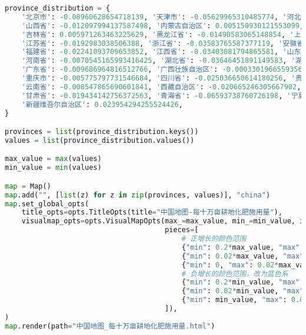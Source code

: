 \begin{lstlisting}[language=python,caption={基础设施}]
province_distribution = {
    '北京市': -0.08960628654718139, '天津市': -0.05629965310485774, '河北省': -0.01812032791303242, 
    '山西省': -0.012097994137587498, '内蒙古自治区': 0.005150930121553099, '辽宁省': -0.012146153771878663, 
    '吉林省': 0.005971263463225629, '黑龙江省': -0.01490583065148854, '上海市': -0.05301926866498563, 
    '江苏省': -0.0192983038506388, '浙江省': -0.03583765587377119, '安徽省': -0.017480241278073683, 
    '福建省': -0.02241093709653852, '江西省': -0.03403081794865581, '山东省': -0.0266357242406009, 
    '河南省': -0.0070545165993416425, '湖北省': -0.03646451891149583, '湖南省': -0.015563959623519754, 
    '广东省': -0.009686964816512766, '广西壮族自治区': -0.00033019665593569947, '海南省': -0.007382193005619597, 
    '重庆市': -0.005775797731546684, '四川省': -0.025036650614180256, '贵州省': -0.02562098695734893, 
    '云南省': -0.008547865690601841, '西藏自治区': -0.020665246305667902, '陕西省': -0.0201640935040992, 
    '甘肃省': -0.019434142756372563, '青海省': -0.06593738760726198, '宁夏回族自治区': -0.008545082053690091, 
    '新疆维吾尔自治区': 0.023954294255524426,
}

provinces = list(province_distribution.keys())
values = list(province_distribution.values())

max_value = max(values)
min_value = min(values)

map = Map()
map.add("", [list(z) for z in zip(provinces, values)], "china")
map.set_global_opts(
    title_opts=opts.TitleOpts(title="中国地图-每十万亩耕地化肥施用量"),
    visualmap_opts=opts.VisualMapOpts(max_=max_value, min_=min_value, is_piecewise=True,
                                      pieces=[
                                          # 正增长的颜色范围
                                          {"min": 0.2*max_value, "max": max_value, "label": "高正增长", "color": "#8B0000"},
                                          {"min": 0.02*max_value, "max": 0.2*max_value, "label": "中正增长", "color": "#FF6347"},
                                          {"min": 0, "max": 0.02*max_value, "label": "低正增长", "color": "#FFA07A"},
                                          # 负增长的颜色范围，改为蓝色系
                                          {"min": 0.2*min_value, "max": 0, "label": "低负增长", "color": "#ADD8E6"},
                                          {"min": 0.02*min_value, "max": 0.2*min_value, "label": "中负增长", "color": "#4169E1"},
                                          {"min": min_value, "max": 0.02*min_value, "label": "高负增长", "color": "#00008B"},
                                      ]),
)
map.render(path="中国地图_每十万亩耕地化肥施用量.html")
\end{lstlisting}

